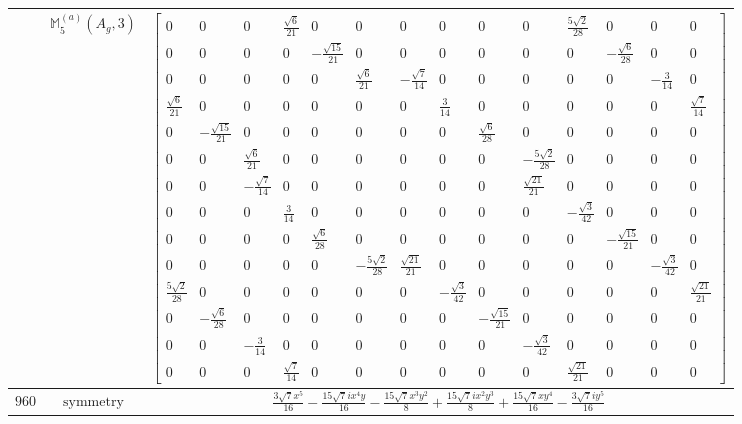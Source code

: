 \documentclass[fleqn,8pt,landscape]{jsarticle}
\begin{document}
\begin{longtable}{ccc}
$  $ & $ \mathbb{M}_{5}^{(a)}(A_{g},3) $ & $ \begin{bmatrix} 0 & 0 & 0 & \frac{\sqrt{6}}{21} & 0 & 0 & 0 & 0 & 0 & 0 & \frac{5 \sqrt{2}}{28} & 0 & 0 & 0 \\ 0 & 0 & 0 & 0 & - \frac{\sqrt{15}}{21} & 0 & 0 & 0 & 0 & 0 & 0 & - \frac{\sqrt{6}}{28} & 0 & 0 \\ 0 & 0 & 0 & 0 & 0 & \frac{\sqrt{6}}{21} & - \frac{\sqrt{7}}{14} & 0 & 0 & 0 & 0 & 0 & - \frac{3}{14} & 0 \\ \frac{\sqrt{6}}{21} & 0 & 0 & 0 & 0 & 0 & 0 & \frac{3}{14} & 0 & 0 & 0 & 0 & 0 & \frac{\sqrt{7}}{14} \\ 0 & - \frac{\sqrt{15}}{21} & 0 & 0 & 0 & 0 & 0 & 0 & \frac{\sqrt{6}}{28} & 0 & 0 & 0 & 0 & 0 \\ 0 & 0 & \frac{\sqrt{6}}{21} & 0 & 0 & 0 & 0 & 0 & 0 & - \frac{5 \sqrt{2}}{28} & 0 & 0 & 0 & 0 \\ 0 & 0 & - \frac{\sqrt{7}}{14} & 0 & 0 & 0 & 0 & 0 & 0 & \frac{\sqrt{21}}{21} & 0 & 0 & 0 & 0 \\ 0 & 0 & 0 & \frac{3}{14} & 0 & 0 & 0 & 0 & 0 & 0 & - \frac{\sqrt{3}}{42} & 0 & 0 & 0 \\ 0 & 0 & 0 & 0 & \frac{\sqrt{6}}{28} & 0 & 0 & 0 & 0 & 0 & 0 & - \frac{\sqrt{15}}{21} & 0 & 0 \\ 0 & 0 & 0 & 0 & 0 & - \frac{5 \sqrt{2}}{28} & \frac{\sqrt{21}}{21} & 0 & 0 & 0 & 0 & 0 & - \frac{\sqrt{3}}{42} & 0 \\ \frac{5 \sqrt{2}}{28} & 0 & 0 & 0 & 0 & 0 & 0 & - \frac{\sqrt{3}}{42} & 0 & 0 & 0 & 0 & 0 & \frac{\sqrt{21}}{21} \\ 0 & - \frac{\sqrt{6}}{28} & 0 & 0 & 0 & 0 & 0 & 0 & - \frac{\sqrt{15}}{21} & 0 & 0 & 0 & 0 & 0 \\ 0 & 0 & - \frac{3}{14} & 0 & 0 & 0 & 0 & 0 & 0 & - \frac{\sqrt{3}}{42} & 0 & 0 & 0 & 0 \\ 0 & 0 & 0 & \frac{\sqrt{7}}{14} & 0 & 0 & 0 & 0 & 0 & 0 & \frac{\sqrt{21}}{21} & 0 & 0 & 0 \end{bmatrix} $ \\ \hline
$ 960 $ & $ \text{symmetry} $ & $ \frac{3 \sqrt{7} x^{5}}{16} - \frac{15 \sqrt{7} i x^{4} y}{16} - \frac{15 \sqrt{7} x^{3} y^{2}}{8} + \frac{15 \sqrt{7} i x^{2} y^{3}}{8} + \frac{15 \sqrt{7} x y^{4}}{16} - \frac{3 \sqrt{7} i y^{5}}{16} $ \\

\end{longtable}
\end{document}
